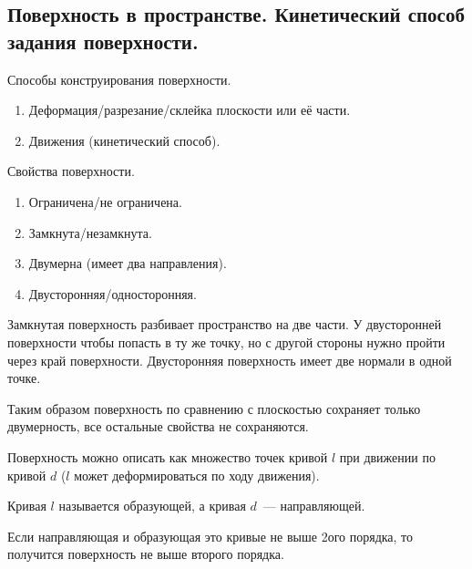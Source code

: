 \subsection{%
  Поверхность в пространстве. Кинетический способ задания поверхности.%
}

Способы конструирования поверхности.

\begin{enumerate}
\item
  Деформация/разрезание/склейка плоскости или её части.

\item
  Движения (кинетический способ).
\end{enumerate}

Свойства поверхности.

\begin{enumerate}
\item
  Ограничена/не ограничена.

\item
  Замкнута/незамкнута.

\item
  Двумерна (имеет два направления).

\item
  Двусторонняя/односторонняя.  
\end{enumerate}

\begin{remark}
  Замкнутая поверхность разбивает пространство на две части. У двусторонней
  поверхности чтобы попасть в ту же точку, но с другой стороны нужно пройти
  через край поверхности. Двусторонняя поверхность имеет две нормали в одной
  точке.

  Таким образом поверхность по сравнению с плоскостью сохраняет только
  двумерность, все остальные свойства не сохраняются.
\end{remark}

Поверхность можно описать как множество точек кривой \(l\) при движении по
кривой \(d\) (\(l\) может деформироваться по ходу движения).

\begin{definition}
  Кривая \(l\) называется образующей, а кривая \(d\)~--- направляющей.
\end{definition}

\begin{remark}
  Если направляющая и образующая это кривые не выше 2ого порядка, то получится
поверхность не выше второго порядка.
\end{remark}
